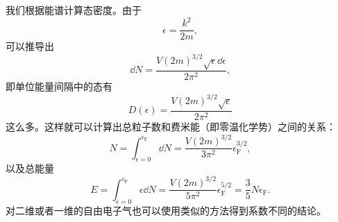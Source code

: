 我们根据能谱计算态密度。由于
\[
    \epsilon = \frac{k^2}{2m},
\]
可以推导出
\[
    \dd{N} = \frac{V (2m)^{3/2} \sqrt{\epsilon} \dd{\epsilon}}{2 \pi^2},
\]
即单位能量间隔中的态有
\begin{equation}
    D(\epsilon) = \frac{V (2m)^{3/2} \sqrt{\epsilon} }{2 \pi^2}
\end{equation}
这么多。这样就可以计算出总粒子数和费米能（即零温化学势）之间的关系：
\begin{equation}
    N = \int_{\epsilon=0}^{\epsilon_{\text{F}}} \dd{N} = \frac{V (2m)^{3/2}}{3 \pi^2} \epsilon_\text{F}^{3/2},
\end{equation}
以及总能量
\begin{equation}
    E = \int_{\epsilon=0}^{\epsilon_{\text{F}}} \epsilon \dd{N} = \frac{V (2m)^{3/2}}{5 \pi^2} \epsilon_\text{F}^{5/2} = \frac{3}{5} N \epsilon_{\text{F}}.
\end{equation}
对二维或者一维的自由电子气也可以使用类似的方法得到系数不同的结论。

